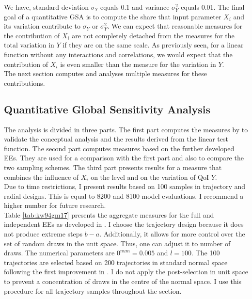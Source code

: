 \noindent
We have, standard deviation $\sigma_Y$ equals 0.1 and variance $\sigma_Y^2$ equals 0.01. The final goal of a quantitative GSA is to compute the share that input parameter $X_i$ and its variation contribute to $\sigma_Y$ or $\sigma_Y^2$. We can expect that reasonable measures for the contribution of $X_i$ are not completely detached from the measures for the total variation in $Y$ if they are on the same scale. As previously seen, for a linear function without any interactions and correlations, we would expect that the contribution of $X_i$ is even smaller than the measure for the variation in $Y$.\\


\noindent
The next section computes and analyses multiple measures for these contributions.


\subsection{Quantitative Global Sensitivity Analysis}

The analysis is divided in three parts. The first part computes the measures by \cite{ge2017extending} to validate the conceptual analysis and the results derived from the linear test function. The second part computes measures based on the further developed EEs. They are used for a comparison with the first part and also to compare the two sampling schemes. The third part presents results for a measure that combines the influence of $X_i$ on the level and on the variation of QoI $Y$.\\

\noindent
Due to time restrictions, I present results based on 100 samples in trajectory and radial designs. This is equal to 8200 and 8100 model evaluations. I recommend a higher number for future research.\\

\noindent
Table \ref{tab:kw94gm17} presents the aggregate measures for the full and independent EEs as developed in \cite{ge2014efficient}. I choose the trajectory design because it does not produce extreme steps $b-a$. Additionally, it allows for more control over the set of random draws in the unit space. Thus, one can adjust it to number of draws. The numerical parameters are $0^{num}=0.005$ and $l=100$. The 100 trajectories are selected based on 200 trajectories in standard normal space following the first improvement in \cite{ge2014efficient}. I do not apply the post-selection in unit space to prevent a concentration of draws in the centre of the normal space. I use this procedure for all trajectory samples throughout the section.\\

